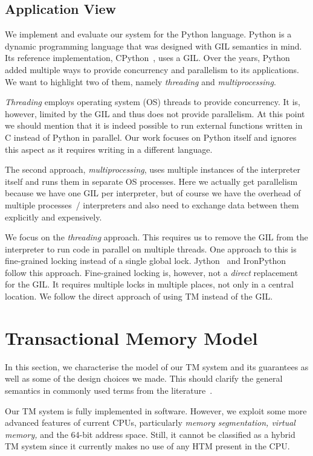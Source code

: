 \documentclass{sigplanconf}
\begin{document}
\subsection{Application View}

We implement and evaluate our system for the Python language. Python
is a dynamic programming language that was designed with GIL semantics
in mind. Its reference implementation, CPython~\cite{cpython}, uses a
GIL. Over the years, Python added multiple ways to provide concurrency and
parallelism to its applications. We want to highlight two of them,
namely \emph{threading} and \emph{multiprocessing}.

\emph{Threading} employs operating system (OS) threads to provide
concurrency. It is, however, limited by the GIL and thus does not
provide parallelism. At this point we should mention that it is indeed
possible to run external functions written in C instead of Python in
parallel. Our work focuses on Python itself and ignores this aspect as
it requires writing in a different language.

The second approach, \emph{multiprocessing}, uses multiple instances
of the interpreter itself and runs them in separate OS processes.
Here we actually get parallelism because we have one GIL per
interpreter, but of course we have the overhead of multiple processes~/
interpreters and also need to exchange data between them explicitly
and expensively.

We focus on the \emph{threading} approach. This requires us to remove
the GIL from the interpreter to run code in parallel on
multiple threads. One approach to this is fine-grained locking instead
of a single global lock. Jython~\cite{webjython} and
IronPython~\cite{ironpython} follow this approach. Fine-grained
locking is, however, not a \emph{direct} replacement for the GIL. It
requires multiple locks in multiple places, not only in a central
location. We follow the direct approach of using TM instead of the
GIL.


\section{Transactional Memory Model}

In this section, we characterise the model of our TM system and its
guarantees as well as some of the design choices we made. This should
clarify the general semantics in commonly used terms from the
literature~\cite{harris10}.

Our TM system is fully implemented in software. However, we exploit
some more advanced features of current CPUs, particularly \emph{memory
segmentation, virtual memory,} and the 64-bit address space. Still,
it cannot be classified as a hybrid TM system since it currently
makes no use of any HTM present in the CPU.
\end{document}
